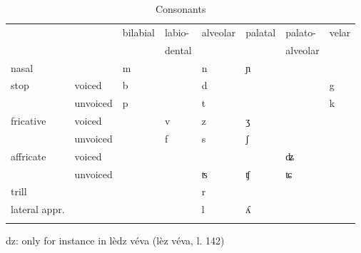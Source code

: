 \begin{table}
\caption{Consonants}
\label{cons}
 \begin{tabular}{llllllll}
  \lsptoprule
      &  & bilabial & labio-  & alveolar  &  palatal & palato- &velar\\
     &&& dental &&& alveolar \\
  \midrule
nasal    &    &  m   & &  n       &  	ɲ & \\

stop &voiced   &  b  &   &  d     &  &  & g\\
  & unvoiced   &  p   &      & t  &  & & k\\
fricative  &  voiced  &      & v        & z &  	ʒ\\
  &  unvoiced  &      &   f      & s & ʃ\\
  affricate & voiced & & & &&ʥ \\
  & unvoiced &&&ʦ & ʧ &ʨ\\
trill  &    &      &         & r \\
lateral appr.  &    &      &         & l & ʎ \\
  \lspbottomrule
 \end{tabular}
\end{table}

dz: only for instance in lèdz véva (lèz véva, l. 142)


